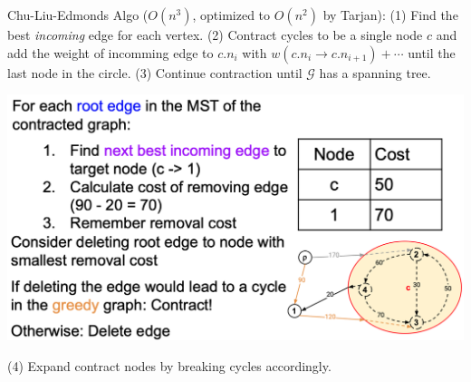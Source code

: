 Chu-Liu-Edmonds Algo ($O(n^3)$, optimized to $O(n^2)$ by Tarjan): \quad
(1) Find the best \emph{incoming} edge for each vertex. 
(2) Contract cycles to be a single node $c$ and add  the weight of incomming edge to $c.n_{i}$ with $w(c.n_{i}\to c.n_{i+1})+\cdots$ until the last node in the circle. 
(3) Continue contraction until $\mathcal{G}$ has a spanning tree. 
\vspace{-0.6cm}
\begin{center}
    \includegraphics[width=\columnwidth]{img/root-remove.png}
\end{center}
\vspace{-0.5cm}
(4) Expand contract nodes by breaking cycles accordingly.
